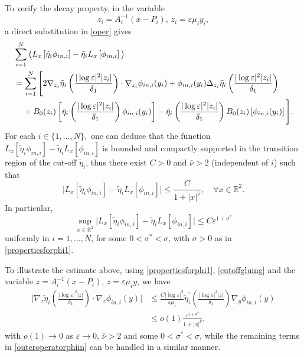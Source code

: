 \documentclass[11pt,reqno,a4paper]{amsart}
\numberwithin{equation}{section}
\newcommand{\R}{\mathbb{R}}
\newcommand{\ve}{\varepsilon}
\begin{document}
To verify the decay property, in the variable \[z_i=A_i^{-1}(x-P_i), \, z_i=\ve\mu_i y_i,\]
a direct substitution in \eqref{oper} gives 
\begin{equation}\label{outeroperatorphiin}
\begin{aligned}
&\sum_{i=1}^{N}\big(L_{x}\left[\tilde{\eta}_i\phi_{in,i}\right]-\tilde{\eta}_i L_{x}\left[\phi_{in,i}\right]\big)\\
&=\sum_{i=1}^{N}\Bigg[2\nabla_{z_i}\tilde{\eta}_{i}\left(\frac{|\log\ve|^2|z_i|}{\delta_1}\right)\cdot\nabla_{z_i}\phi_{in,i}(y_i)+\phi_{in,i}(y_i)\Delta_{z_i}\tilde{\eta}_i\left(\frac{|\log\ve|^2|z_i|}{\delta_1}\right)\\
&\hspace{4mm}+B_0(z_i)\left[\tilde{\eta}_i\left(\frac{|\log\ve|^2|z_i|}{\delta_1}\right)\phi_{in,i}(y_i)\right]-\tilde{\eta}_i\left(\frac{|\log\ve|^2|z_i|}{\delta_1}\right)B_0(z_i)\left[\phi_{in,i}(y_i)\right]\Bigg].        
\end{aligned}
\end{equation}
For each $i\in\{1,\dots,N\},$ one can deduce that the function $L_{x}[\tilde{\eta}_i\phi_{in,i}]-\tilde{\eta}_iL_{x}[\phi_{in,i}]$
is bounded and compactly supported in the transition region of the cut-off $\tilde{\eta}_i$, thus there exist $C>0$ and $\bar\nu >2$ (independent of $i$) such that \[\big|L_{x}[\tilde{\eta}_i\phi_{in,i}]-\tilde{\eta}_iL_{x}[\phi_{in,i}]\big| \leq \frac{C}{1+|x|^{\bar\nu}},\quad \forall x\in\R^2.\] 
In particular, \[\sup\limits_{x\in\R^2}\big|L_{x}\left[\tilde{\eta}_i\phi_{in,i}\right]-\tilde{\eta}_iL_{x}\left[\phi_{in,i}\right]\big|\leq C\ve^{1+\sigma^{*}}\]
uniformly in $i=1,\dots,N$, for some $0<\sigma^{*}<\sigma$, with $\sigma>0$ as in \eqref{propertiesforphi1}. 

To illustrate the estimate above, using \eqref{propertiesforphi1}, \eqref{cutoffgluing} and the variable $z=A_i^{-1}(x-P_i),\,z=\ve\mu_i y$, we have
\begin{equation}\nonumber
\begin{aligned}
\Bigg|\nabla_{z}\tilde{\eta}_i\left(\frac{|\log\ve|^2|z|}{\delta_1}\right)\cdot\nabla_{z}\phi_{in,i}(y)\Bigg|&\leq \frac{C|\log\ve|^2
}{\ve\mu_i}\tilde{\eta}_i^{'}\left(\frac{|\log\ve|^2|z
|}{\delta_1}\right)\nabla_{y}\phi_{in,i}(y)\\
&\leq o(1) \frac{\ve ^{1+\sigma^{*}}}{1+|x|^{\bar{\nu}}},
\end{aligned}
\end{equation}
with $o(1)\to 0$ as $\ve \to 0,\, \bar{\nu}>2$ and some $0<\sigma^{*}<\sigma$, while the remaining terms in \eqref{outeroperatorphiin} can be handled in a similar manner.
\end{document}
